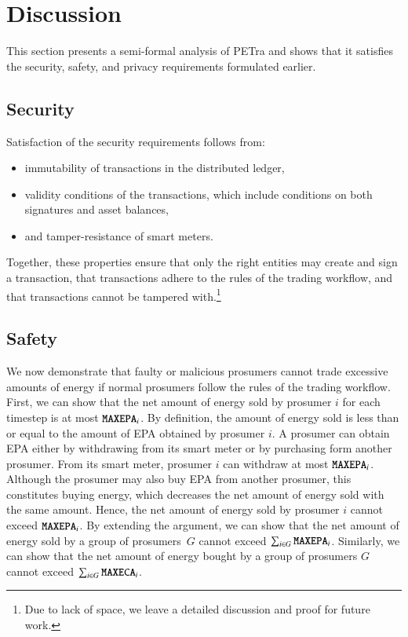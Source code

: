 \section{Discussion}
\label{sec:discussion}

This section presents a semi-formal analysis of PETra
and shows that it satisfies the security, safety, and privacy
requirements formulated earlier.

\subsection{Security}
Satisfaction of the security requirements follows from:
\begin{itemize}[noitemsep,topsep=-\parskip]
\item immutability of transactions in the distributed ledger,
\item validity conditions of the transactions, which include conditions on both signatures and asset balances,
\item and tamper-resistance of smart meters.
\end{itemize}
Together, these properties ensure that only the right entities may
create and sign a transaction, that transactions adhere to the rules
of the trading workflow, and that transactions cannot be tampered
with.\footnote{Due to lack of space, we leave a detailed discussion
  and proof for future work.}

\subsection{Safety}
We now demonstrate that faulty or malicious prosumers cannot trade
excessive amounts of energy if normal prosumers follow the rules of
the trading workflow.
%
First, we can show that the net amount of energy sold by prosumer $i$ for
each timestep is at most $\texttt{MAXEPA}_i$.  By definition, the
amount of energy sold is less than or equal to the amount of EPA
obtained by prosumer $i$.  A prosumer can obtain EPA either by
withdrawing from its smart meter or by purchasing form another
prosumer.  From its smart meter, prosumer $i$ can withdraw at most
$\texttt{MAXEPA}_i$.
Although the prosumer may also buy EPA from another prosumer, this
constitutes buying energy, which decreases the net amount of energy
sold with the same amount.
Hence, the net amount of energy sold by prosumer $i$ cannot exceed
$\texttt{MAXEPA}_i$.  By extending the argument, we can show that the net
amount of energy sold by a group of prosumers~$G$ cannot exceed
$\sum_{i \in G} \texttt{MAXEPA}_i$.  Similarly, we can show that the net
amount of energy bought by a group of prosumers $G$ cannot exceed
$\sum_{i \in G} \texttt{MAXECA}_i$.

